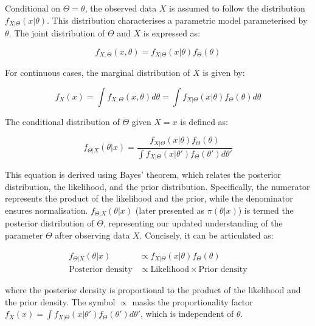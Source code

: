 \documentclass[
  11pt,
]{article}
\begin{document}
Conditional on \(\Theta = \theta\), the observed data \(X\) is assumed
to follow the distribution \(f_{X|\Theta}(x|\theta)\). This distribution
characterises a parametric model parameterised by \(\theta\). The joint
distribution of \(\Theta\) and \(X\) is expressed as:

\begin{equation}
f_{X,\Theta}(x, \theta) = f_{X|\Theta}(x|\theta) f_\Theta(\theta)
\end{equation}

For continuous cases, the marginal distribution of \(X\) is given by:

\begin{equation}
f_X(x) = \int f_{X,\Theta}(x, \theta) d\theta = \int f_{X|\Theta}(x|\theta) f_\Theta(\theta) d\theta
\end{equation}

The conditional distribution of \(\Theta\) given \(X = x\) is defined
as:

\begin{equation}
f_{\Theta|X}(\theta|x) = \frac{f_{X|\Theta}(x|\theta) f_\Theta(\theta)}{\int f_{X|\Theta}(x|\theta') f_\Theta(\theta') d\theta'}
\end{equation}

This equation is derived using Bayes' theorem, which relates the
posterior distribution, the likelihood, and the prior distribution.
Specifically, the numerator represents the product of the likelihood and
the prior, while the denominator ensures normalisation.
\(f_{\Theta|X}(\theta|x)\) (later presented as \(\pi(\theta|x)\)) is
termed the posterior distribution of \(\Theta\), representing our
updated understanding of the parameter \(\Theta\) after observing data
\(X\). Concisely, it can be articulated as:

\begin{equation}
\begin{aligned}
    f_{\Theta|X}(\theta|x) &\propto f_{X|\Theta}(x|\theta) f_\Theta(\theta) \label{eq:posterior} \\
    \text{Posterior density} &\propto \text{Likelihood} \times \text{Prior density} 
\end{aligned}
\end{equation}

where the posterior density is proportional to the product of the
likelihood and the prior density. The symbol \(\propto\) masks the
proportionality factor
\(f_X(x) = \int f_{X|\Theta}(x|\theta') f_\Theta(\theta') d\theta'\),
which is independent of \(\theta\).
\end{document}
